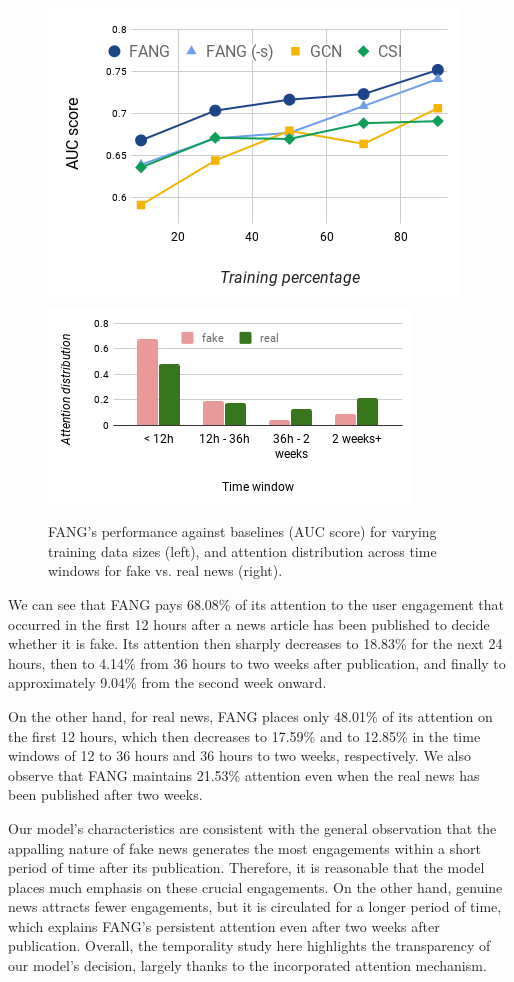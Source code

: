 \documentclass[sigconf]{acmart}
\theoremstyle{definition}
\theoremstyle{hypothesis}
\begin{document}
\begin{figure}[t]
\centering
\includegraphics[scale=0.25]{limited.png}
\includegraphics[scale=0.35]{attention.png}
\caption{FANG's performance against baselines (AUC score) for varying training data sizes (left), and attention distribution across time windows for fake vs. real news (right).}
\label{fig:limited_and_attention}
\end{figure}

We can see that FANG pays 68.08\% of its attention to the user engagement that occurred in the first 12 hours after a news article has been published to decide whether it is fake. Its attention then sharply decreases to 18.83\% for the next 24 hours, then to 4.14\% from 36 hours to two weeks after publication, and finally to approximately 9.04\% from the second week onward. 

On the other hand, for real news, FANG places only 48.01\% of its attention on the first 12 hours, which then decreases to 17.59\% and to 12.85\% in the time windows of 12 to 36 hours and 36 hours to two weeks, respectively. We also observe that FANG maintains 21.53\% attention even when the real news has been published after two weeks.

Our model's characteristics are consistent with the general observation that the appalling nature of fake news generates the most engagements within a short period of time after its publication. Therefore, it is reasonable that the model places much emphasis on these crucial engagements. On the other hand, genuine news attracts fewer engagements, but it is circulated for a longer period of time, which explains FANG's persistent attention even after two weeks after publication. Overall, the temporality study here highlights the transparency of our model's decision, largely thanks to the incorporated attention mechanism. 
\end{document}
